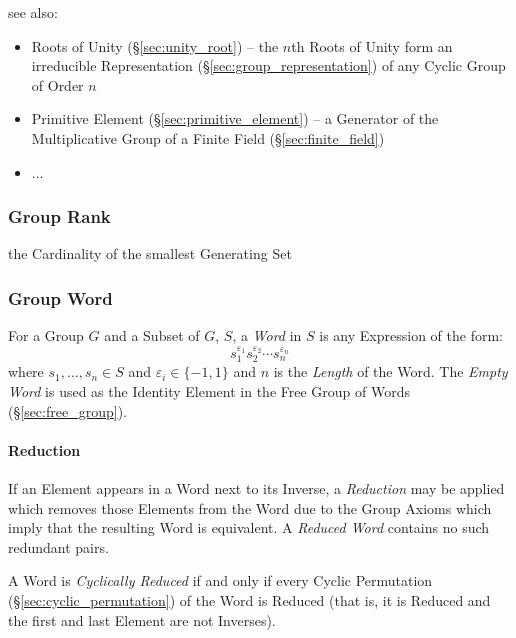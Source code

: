 see also:
\begin{itemize}
  \item Roots of Unity (\S\ref{sec:unity_root}) -- the $n$th Roots of Unity form
    an irreducible Representation (\S\ref{sec:group_representation}) of any
    Cyclic Group of Order $n$
  \item Primitive Element (\S\ref{sec:primitive_element}) -- a Generator of the
    Multiplicative Group of a Finite Field (\S\ref{sec:finite_field})
  \item ...
\end{itemize}



\subsubsection{Group Rank}\label{sec:group_rank}

the Cardinality of the smallest Generating Set



\subsubsection{Group Word}\label{sec:group_word}

For a Group $G$ and a Subset of $G$, $S$, a \emph{Word} in $S$ is any Expression
of the form:
\[
    s_1^{\varepsilon_1}s_2^{\varepsilon_2} \cdots s_n^{\varepsilon_n}
\]
where $s_1,\ldots,s_n \in S$ and $\varepsilon_i \in \{-1, 1\}$ and $n$ is the
\emph{Length} of the Word. The \emph{Empty Word} is used as the Identity Element
in the Free Group of Words (\S\ref{sec:free_group}).



\paragraph{Reduction}\label{sec:word_reduction}\hfill

If an Element appears in a Word next to its Inverse, a \emph{Reduction} may be
applied which removes those Elements from the Word due to the Group Axioms which
imply that the resulting Word is equivalent. A \emph{Reduced Word} contains no
such redundant pairs.

A Word is \emph{Cyclically Reduced} if and only if every Cyclic Permutation
(\S\ref{sec:cyclic_permutation}) of the Word is Reduced (that is, it is Reduced
and the first and last Element are not Inverses).



